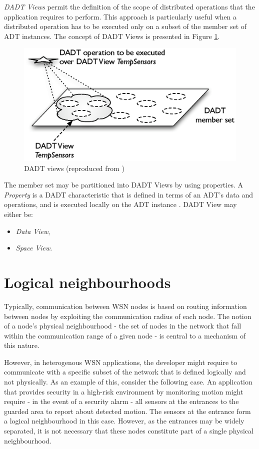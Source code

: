 \emph{DADT Views} permit the definition of the scope of distributed operations
that the application requires to perform. This approach is particularly useful
when a distributed operation has to be executed only on a subset of the
member set of ADT instances. The concept of DADT Views is presented in Figure
\ref{Fig:DADT_Views}.

\begin{figure}[h]
\centering
\includegraphics[scale=0.75]{img/DADT_Views.eps} 
\caption[DADT Views]{DADT views (reproduced from \cite{migliavacca_DADT:2006})}
\label{Fig:DADT_Views}
\end{figure}

The member set may be partitioned into DADT Views by using properties. A
\emph{Property} is a DADT characteristic that is defined in terms of an ADT's
data and operations, and is executed locally on the ADT instance
\cite{migliavacca_DADT:2006}.
DADT View may either be:
\begin{itemize}
  \item \emph{Data View},
  \item \emph{Space View}.
\end{itemize}


\section {Logical neighbourhoods} \label{LNDescription}

Typically, communication between WSN nodes is based on routing 
information between nodes by exploiting the communication radius of each node.
The notion of a node's physical neighbourhood - the set of nodes in the
network that fall within the communication range of a given node - is central to a mechanism of this nature.

However, in heterogenous WSN applications, the developer might require to
communicate with a specific subset of the network that is defined logically and
not physically. As an example of this, consider the following case. An
application that provides security in a high-risk environment by monitoring 
motion might require - in the event of a security alarm - all sensors at the
entrances to the guarded area to report about detected motion.
The sensors at the entrance form a logical neighbourhood in this case. However,
as the entrances may be widely separated, it is not necessary that these nodes
constitute part of a single physical neighbourhood.


